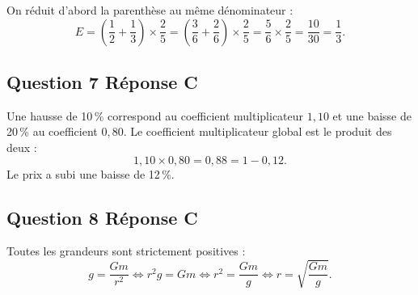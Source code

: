\documentclass[10pt]{article}
\begin{document}
On réduit d'abord la parenthèse au même dénominateur :
\[E = \left(\dfrac{1}{2} + \dfrac{1}{3}\right)\times\dfrac{2}{5}
= \left(\dfrac{3}{6} + \dfrac{2}{6}\right)\times\dfrac{2}{5}
= \dfrac{5}{6}\times\dfrac{2}{5} = \dfrac{10}{30} = \dfrac{1}{3}.\]

\subsection*{Question 7 \quad Réponse C}

Une hausse de 10\,\% correspond au coefficient multiplicateur $1,10$ et une baisse de
20\,\% au coefficient $0,80$. Le coefficient multiplicateur global est le produit
des deux :
\[1,10 \times 0,80 = 0,88 = 1 - 0,12.\]
Le prix a subi une baisse de 12\,\%.

\subsection*{Question 8 \quad Réponse C}

Toutes les grandeurs sont strictement positives :
\[g = \dfrac{Gm}{r^2} \iff r^2 g = Gm \iff r^2 = \dfrac{Gm}{g} \iff r = \sqrt{\dfrac{Gm}{g}}.\]
\end{document}
